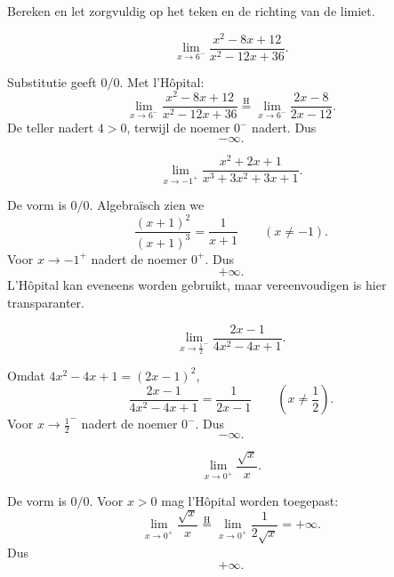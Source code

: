 \documentclass{ximera}
\begin{document}
\begin{oefening}{\oefU\ESS}

Bereken en let zorgvuldig op het teken en de richting van de limiet.

\begin{question}
\[\lim_{x\to6^-}\frac{x^2-8x+12}{x^2-12x+36}.\]

\begin{oplossing}
Substitutie geeft \(0/0\). Met l'Hôpital:
\[\lim_{x\to6^-}\frac{x^2-8x+12}{x^2-12x+36}\overset{\mathrm H}{=}\lim_{x\to6^-}\frac{2x-8}{2x-12}.\]
De teller nadert \(4>0\), terwijl de noemer \(0^-\) nadert. Dus
\[\boxed{-\infty}.\]
\end{oplossing}
\end{question}

\begin{question}
\[\lim_{x\to-1^+}\frac{x^2+2x+1}{x^3+3x^2+3x+1}.\]

\begin{oplossing}
De vorm is \(0/0\). Algebraïsch zien we
\[\frac{(x+1)^2}{(x+1)^3}=\frac1{x+1}\qquad(x\neq-1).\]
Voor \(x\to-1^+\) nadert de noemer \(0^+\). Dus
\[\boxed{+\infty}.\]
L'Hôpital kan eveneens worden gebruikt, maar vereenvoudigen is hier
transparanter.
\end{oplossing}
\end{question}

\begin{question}
\[\lim_{x\to\frac12^-}\frac{2x-1}{4x^2-4x+1}.\]

\begin{oplossing}
Omdat \(4x^2-4x+1=(2x-1)^2\),
\[\frac{2x-1}{4x^2-4x+1}=\frac1{2x-1}\qquad\left(x\neq\frac12\right).\]
Voor \(x\to\frac12^-\) nadert de noemer \(0^-\). Dus
\[\boxed{-\infty}.\]
\end{oplossing}
\end{question}

\begin{question}
\[\lim_{x\to0^+}\frac{\sqrt{x}}{x}.\]

\begin{oplossing}
De vorm is \(0/0\). Voor \(x>0\) mag l'Hôpital worden toegepast:
\[\lim_{x\to0^+}\frac{\sqrt{x}}x\overset{\mathrm H}{=}\lim_{x\to0^+}\frac1{2\sqrt{x}}=+\infty.\]
Dus
\[\boxed{+\infty}.\]
\end{oplossing}
\end{question}
\end{oefening}
\end{document}
